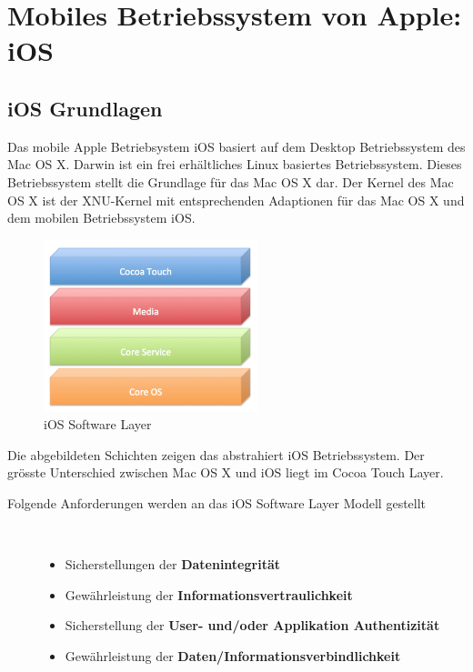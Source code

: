 %
%
% 
% 
% 
\chapter{Mobiles Betriebssystem von Apple: iOS}
\label{ch:iOS}
\section{iOS Grundlagen}
\label{sec:iOSGrundlage}

Das mobile Apple Betriebsystem iOS basiert auf dem Desktop Betriebssystem des
Mac OS X. Darwin ist ein frei erhältliches Linux basiertes Betriebssystem.
Dieses Betriebssystem stellt die Grundlage für das Mac OS X dar. 
Der Kernel des Mac OS X ist der XNU-Kernel mit entsprechenden Adaptionen für
das Mac OS X und dem mobilen Betriebssystem iOS.
\begin{figure}[htbp]
        \centering
                \includegraphics[height=5cm]{Bilder/Chapter3_SystemArchitektur}
        \caption{iOS Software Layer\cite{Apple[6]}}
        	\label{fig:iOS Software Layer}
\end{figure}
Die abgebildeten Schichten zeigen das abstrahiert iOS Betriebssystem. Der
grösste Unterschied zwischen Mac OS X und iOS liegt im Cocoa Touch Layer.
  
\begin{description}
\item[Folgende \glqq Anforderungen\grqq{} werden an das iOS Software Layer
Modell gestellt]~\par
	\begin{itemize}
		\item Sicherstellungen der \textbf{Datenintegrität}
		\item Gewährleistung der \textbf{Informationsvertraulichkeit}
		\item Sicherstellung der \textbf{User- und/oder Applikation Authentizität}
		\item Gewährleistung der \textbf{Daten/Informationsverbindlichkeit}
	\end{itemize}
\end{description}

